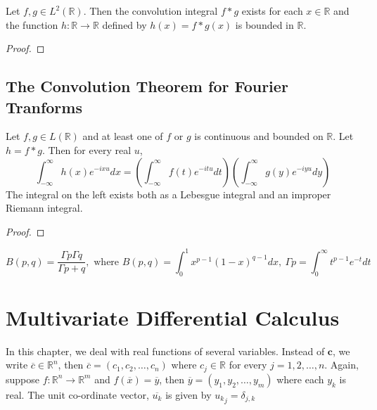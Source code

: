 \begin{theorem}
	Let \( f,g \in L^2(\mathbb{R}) \). Then the convolution integral $f \ast g$ exists for each \( x \in \mathbb{R} \) and the function \( h : \mathbb{R} \to \mathbb{R} \) defined by \( h(x) = f \ast g (x) \) is bounded in $\mathbb{R}$.
\end{theorem}
\begin{synopsis}
\end{synopsis}
\begin{proof}
\end{proof}

\subsection{The Convolution Theorem for Fourier Tranforms}
\begin{theorem}
	Let \( f,g \in L(\mathbb{R}) \) and at least one of $f$ or $g$ is continuous and bounded on $\mathbb{R}$. Let \( h = f \ast g \). Then for every real $u$,
	\[ \int_{-\infty}^\infty h(x) e^{-ixu} dx = \left( \int_{-\infty}^\infty f(t) e^{-itu} dt \right) \left( \int_{-\infty}^\infty g(y) e^{-iyu} dy \right) \]
	The integral on the left exists both as a Lebesgue integral and an improper Riemann integral.
\end{theorem}
\begin{synopsis}
\end{synopsis}
\begin{proof}
\end{proof}

\begin{remark}
	\[ B(p,q) = \frac{\Gamma{p} \Gamma{q}}{\Gamma{p+q}},\text{ where } B(p,q) = \int_0^1 x^{p-1} (1-x)^{q-1} dx,\ \Gamma{p} = \int_0^\infty t^{p-1} e^{-t} dt \]
\end{remark}

\section{Multivariate Differential Calculus}
	In this chapter, we deal with real functions of several variables. Instead of $\mathbf{c}$, we write \( \overline{c} \in \mathbb{R}^n \), then \( \overline{c} = (c_1, c_2, \dotsc, c_n) \) where \( c_j \in \mathbb{R} \) for every \(j = 1,2, \dotsc, n\). Again, suppose \(f : \mathbb{R}^n \to \mathbb{R}^m\) and \(f(\overline{x}) = \overline{y}\), then \(\overline{y} = (y_1, y_2, \dotsc, y_m)\) where each $y_k$ is real. The unit co-ordinate vector, $\overline{u_k}$ is given by \( {u_k}_j = \delta_{j,k} \)

